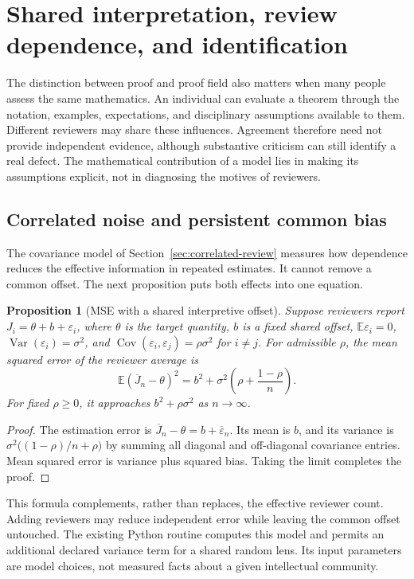 \documentclass[11pt,oneside]{article}
\theoremstyle{komorebiplain}
\newtheorem{proposition}[theorem]{Proposition}
\theoremstyle{komorebidefinition}
\theoremstyle{komorebiremark}
\begin{document}
\section{Shared interpretation, review dependence, and identification}
\label{sec:old25}
\label{sec:interpretation}

The distinction between proof and proof field also matters when many people assess the same mathematics. An individual can evaluate a theorem through the notation, examples, expectations, and disciplinary assumptions available to them. Different reviewers may share these influences. Agreement therefore need not provide independent evidence, although substantive criticism can still identify a real defect. The mathematical contribution of a model lies in making its assumptions explicit, not in diagnosing the motives of reviewers.

\subsection{Correlated noise and persistent common bias}

The covariance model of Section~\ref{sec:correlated-review} measures how dependence reduces the effective information in repeated estimates. It cannot remove a common offset. The next proposition puts both effects into one equation.

\begin{proposition}[MSE with a shared interpretive offset]
\label{res:25:1}
Suppose reviewers report $J_i=\theta+b+\varepsilon_i$, where $\theta$ is the target quantity, $b$ is a fixed shared offset, $\mathbb E\varepsilon_i=0$, $\operatorname{Var}(\varepsilon_i)=\sigma^2$, and $\operatorname{Cov}(\varepsilon_i,\varepsilon_j)=\rho\sigma^2$ for $i\ne j$. For admissible $\rho$, the mean squared error of the reviewer average is
\[
\boxed{\mathbb E(\overline J_n-\theta)^2=b^2+\sigma^2\left(\rho+\frac{1-\rho}{n}\right).}
\]
For fixed $\rho\ge0$, it approaches $b^2+\rho\sigma^2$ as $n\to\infty$.
\end{proposition}
\begin{proof}
The estimation error is $\overline J_n-\theta=b+\overline\varepsilon_n$. Its mean is $b$, and its variance is $\sigma^2\big((1-\rho)/n+\rho\big)$ by summing all diagonal and off-diagonal covariance entries. Mean squared error is variance plus squared bias. Taking the limit completes the proof.
\end{proof}

This formula complements, rather than replaces, the effective reviewer count. Adding reviewers may reduce independent error while leaving the common offset untouched. The existing Python routine  computes this model and permits an additional declared variance term for a shared random lens. Its input parameters are model choices, not measured facts about a given intellectual community.
\end{document}

